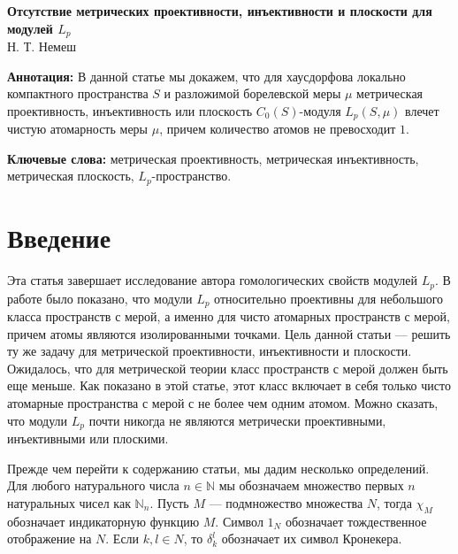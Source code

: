\documentclass[12pt]{article}
\begin{document}
\begin{center}
    \Large \textbf{Отсутствие метрических проективности, инъективности и 
    плоскости для модулей $L_p$}\\[0.5cm]
    \small {Н. Т. Немеш}\\[0.5cm]
\end{center}

\thispagestyle{empty}

\medskip
\textbf{Аннотация:} В данной статье мы докажем, что для хаусдорфова 
локально компактного пространства $S$ и разложимой борелевской меры $\mu$ 
метрическая проективность, инъективность или 
плоскость $C_0(S)$-модуля $L_p(S,\mu)$ влечет чистую атомарность меры $\mu$, 
причем количество атомов не превосходит $1$.
\medskip

\textbf{Ключевые слова:} метрическая проективность, метрическая инъективность, 
метрическая плоскость, $L_p$-пространство.

\bigskip


\section{Введение}\label{SctnIntro}

Эта статья завершает исследование автора гомологических свойств модулей $L_p$. 
В работе \cite{NemRelProjModLp} было показано, что модули $L_p$ относительно 
проективны для небольшого класса пространств с мерой, а именно для чисто 
атомарных пространств с мерой, причем атомы являются изолированными точками. Цель 
данной статьи --- решить ту же задачу для метрической проективности, 
инъективности и плоскости. Ожидалось, что для метрической теории класс 
пространств с мерой должен быть еще меньше. Как показано в этой статье, этот 
класс включает в себя только чисто атомарные пространства с мерой с не более 
чем одним атомом. Можно сказать, что модули $L_p$ почти 
никогда не являются метрически проективными, инъективными или плоскими.

Прежде чем перейти к содержанию статьи, мы дадим несколько определений. 
Для любого натурального числа $n\in\mathbb{N}$ мы обозначаем множество первых 
$n$ натуральных чисел как $\mathbb{N}_n$. Пусть $M$ --- подмножество множества 
$N$, тогда $\chi_M$ обозначает индикаторную функцию $M$. Символ $1_N$ обозначает 
тождественное отображение на $N$. Если $k,l\in N$, то $\delta_{k}^{l}$ обозначает 
их символ Кронекера.
\end{document}
